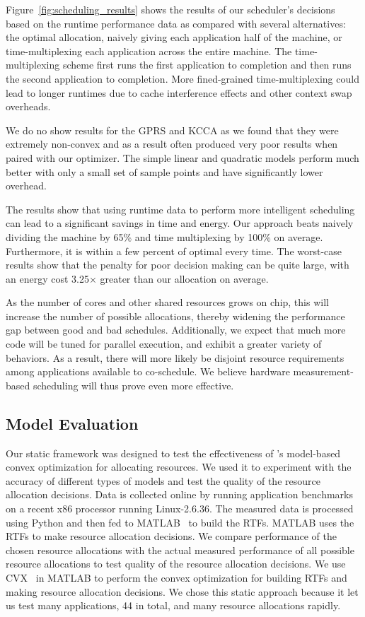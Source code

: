 Figure~\ref{fig:scheduling_results} shows the results of our
scheduler's decisions based on the runtime performance data as
compared with several alternatives: the optimal allocation, naively
giving each application half of the machine, or time-multiplexing each
application across the entire machine.  The time-multiplexing scheme
first runs the first application to completion and then runs the
second application to completion.  More fined-grained
time-multiplexing could lead to longer runtimes due to cache
interference effects and other context swap overheads.

We do no show results for the GPRS and KCCA as we found that they were extremely non-convex and as a result often produced very poor results when paired with our optimizer. The simple linear and quadratic models perform much better with only a small set of sample points and have significantly lower overhead.

The results
show that using runtime data to perform more intelligent scheduling
can lead to a significant savings in time and energy.  Our approach
beats naively dividing the machine by 65\% and time multiplexing by
100\% on average. Furthermore, it is within a few percent of optimal
every time.  The worst-case results show that the penalty for poor
decision making can be quite large, with an energy cost 3.25$\times$
greater than our allocation on average.

As the number of cores and other shared resources grows on chip, this
will increase the number of possible allocations, thereby widening the
performance gap between good and bad schedules.  Additionally, we
expect that much more code will be tuned for parallel execution, and
exhibit a greater variety of behaviors.  As a result, there will more
likely be disjoint resource requirements among applications available
to co-schedule.  We believe hardware measurement-based scheduling will
thus prove even more effective.


\subsection{Model Evaluation}
Our static framework was designed to test the effectiveness of \pacora's model-based convex optimization for allocating resources.  We used it to experiment with the accuracy of different types of models and test the quality of the resource allocation decisions. Data is collected online by running application benchmarks on a recent x86 processor running Linux-2.6.36.  The measured data is processed using Python and then fed to MATLAB~\cite{matlab} to build the RTFs.  MATLAB uses the RTFs to make resource allocation decisions.  We compare performance of the chosen resource allocations with the actual measured performance of all possible resource allocations to test quality of the resource allocation decisions. We use CVX~\cite{cvx} in MATLAB to perform the convex optimization for building RTFs and making resource allocation decisions.  We chose this static approach because it let us test many applications, 44 in total, and many resource allocations rapidly.

